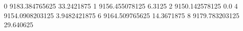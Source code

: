 0 9183.384765625 33.2421875
1 9156.455078125 6.3125
2 9150.142578125 0.0
4 9154.0908203125 3.9482421875
6 9164.509765625 14.3671875
8 9179.783203125 29.640625
